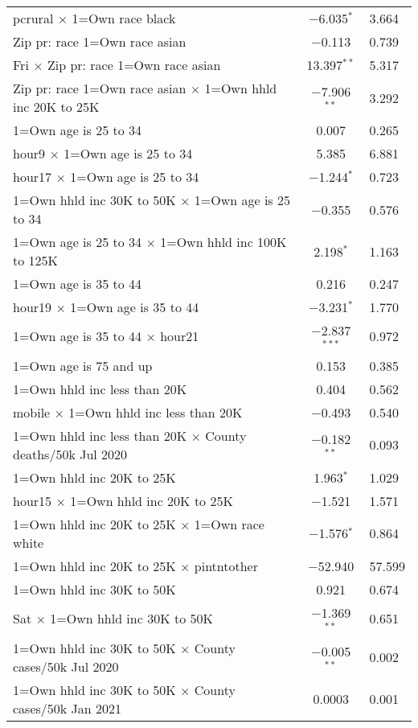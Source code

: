 \begin{table}[!htbp]
\begin{tabular}{@{\extracolsep{5pt}}lc}
  pcrural $\times$ 1=Own race black & $-$6.035$^{*}$ & 3.664 \\ 
  Zip pr: race 1=Own race asian & $-$0.113 & 0.739 \\ 
  Fri $\times$ Zip pr: race 1=Own race asian & 13.397$^{**}$ & 5.317 \\ 
  Zip pr: race 1=Own race asian $\times$ 1=Own hhld inc 20K to 25K & $-$7.906$^{**}$ & 3.292 \\ 
  1=Own age is 25 to 34 & 0.007 & 0.265 \\ 
  hour9 $\times$ 1=Own age is 25 to 34 & 5.385 & 6.881 \\ 
  hour17 $\times$ 1=Own age is 25 to 34 & $-$1.244$^{*}$ & 0.723 \\ 
  1=Own hhld inc 30K to 50K $\times$ 1=Own age is 25 to 34 & $-$0.355 & 0.576 \\ 
  1=Own age is 25 to 34 $\times$ 1=Own hhld inc 100K to 125K & 2.198$^{*}$ & 1.163 \\ 
  1=Own age is 35 to 44 & 0.216 & 0.247 \\ 
  hour19 $\times$ 1=Own age is 35 to 44 & $-$3.231$^{*}$ & 1.770 \\ 
  1=Own age is 35 to 44 $\times$ hour21 & $-$2.837$^{***}$ & 0.972 \\ 
  1=Own age is 75 and up  & 0.153 & 0.385 \\ 
  1=Own hhld inc less than 20K & 0.404 & 0.562 \\ 
  mobile $\times$ 1=Own hhld inc less than 20K & $-$0.493 & 0.540 \\ 
  1=Own hhld inc less than 20K $\times$ County deaths/50k Jul 2020 & $-$0.182$^{**}$ & 0.093 \\ 
  1=Own hhld inc 20K to 25K & 1.963$^{*}$ & 1.029 \\ 
  hour15 $\times$ 1=Own hhld inc 20K to 25K & $-$1.521 & 1.571 \\ 
  1=Own hhld inc 20K to 25K $\times$ 1=Own race white & $-$1.576$^{*}$ & 0.864 \\ 
  1=Own hhld inc 20K to 25K $\times$ pintntother & $-$52.940 & 57.599 \\ 
  1=Own hhld inc 30K to 50K & 0.921 & 0.674 \\ 
  Sat $\times$ 1=Own hhld inc 30K to 50K & $-$1.369$^{**}$ & 0.651 \\ 
  1=Own hhld inc 30K to 50K $\times$ County cases/50k Jul 2020 & $-$0.005$^{**}$ & 0.002 \\ 
  1=Own hhld inc 30K to 50K $\times$ County cases/50k Jan 2021 & 0.0003 & 0.001 \\ 

\end{tabular}
\end{table}
